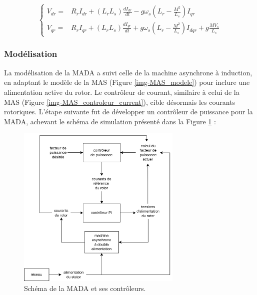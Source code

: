 \begin{equation}
    \left\{
    \begin{aligned}
        V_{dr} =& R_r I_{dr} + \left( L_r  L_s \right)\frac{dI_{dr}}{dt} - g \omega_s (L_r - \frac{M^2}{L_s}) I_{qr} \\
        V_{qr} =& R_r I_{qr} + \left( L_r  L_s \right)\frac{dI_{qr}}{dt} + g \omega_s (L_r - \frac{M^2}{L_s}) I_{dqr} + g 
        \frac{M V_s}{L_s}
        \label{eq:MADA10}
    \end{aligned}
    \right.
    \label{eq:MADA7}
\end{equation}


\FloatBarrier
\subsubsection{Modélisation}

La modélisation de la MADA a suivi celle de la machine asynchrone à induction, en adaptant le modèle de la MAS (Figure \ref{img-MAS_modele}) pour inclure une alimentation active du rotor. Le contrôleur de courant, similaire à celui de la MAS (Figure \ref{img-MAS_controleur_current}), cible désormais les courants rotoriques. L'étape suivante fut de développer un contrôleur de puissance pour la MADA, achevant le schéma de simulation présenté dans la Figure \ref{img-diagMADA} :

\begin{figure}[!h]
    \centering
    \includegraphics[width=0.7\textwidth]{diagrammes/diagMADA.png} 
    \caption{Schéma de la MADA et ses contrôleurs.}
    \label{img-diagMADA}
\end{figure}

